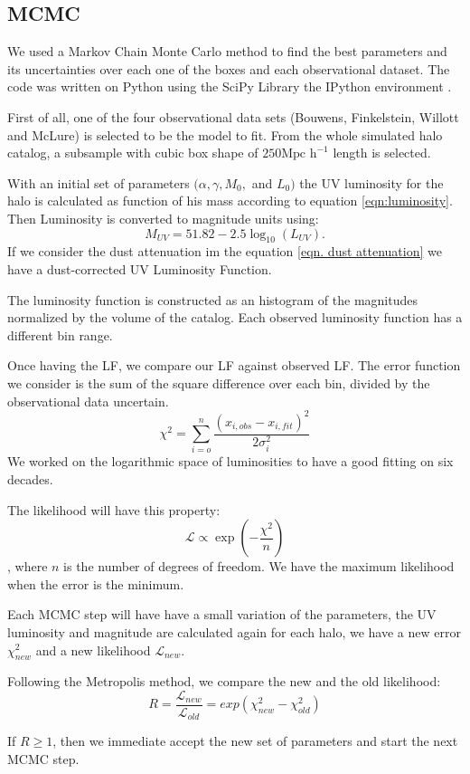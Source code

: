 \documentclass{emulateapj}
\begin{document}
\subsection{MCMC}
We used a Markov Chain Monte Carlo method to find the best parameters and its 
uncertainties over each one of the boxes and each observational dataset. The 
code was written on Python using the SciPy Library \citep{SciPy}
the IPython environment \citep{IPython}.

First of all, one of the four observational data sets (Bouwens, Finkelstein, 
Willott and McLure) is selected to be the model to fit.
From the whole simulated halo catalog, a subsample with cubic box shape of 
 $250\textrm{Mpc h}^{-1}$ length is selected. 
 
With an initial set of parameters $(\alpha, \gamma, M_0,$ and $ L_0)$ the UV 
luminosity for the halo is calculated as function of his mass according to 
equation
 \ref{eqn:luminosity}. Then Luminosity is converted to magnitude units using:
  \[ M_{UV} = 51.82 - 2.5 \log_{10}(L_{UV}). \]
If we consider the dust attenuation im the equation \ref{eqn. dust attenuation} 
we have a dust-corrected UV Luminosity Function.

The luminosity function is constructed as an histogram of the magnitudes 
normalized by the volume of the catalog. Each observed luminosity function has a 
different bin range.

Once having the LF, we compare our LF against observed LF. The error function we 
consider is the sum of the square difference over each bin, divided by the 
observational data uncertain.
\[ \chi^2  = \sum_{i=o}^{n} \frac {\left( x_{i,obs} - x_{i,fit} \right)^2 }{2\sigma_i^2}\]
We worked on the logarithmic space of luminosities to have a good fitting on
six decades.

The likelihood will have this property:
\[ \mathcal{L} \propto \exp \left(  -\frac{\chi ^2}{n} \right) \], where $n$ is 
the number of degrees of freedom. We have the maximum likelihood when the error 
is the minimum.

Each MCMC step will have have a small variation of the parameters, the UV 
luminosity and magnitude are calculated again for each halo, we have a new error 
$\chi_{new}^2$ and a new likelihood $ \mathcal{L}_{new} $.

Following the Metropolis method, we compare the new and the old likelihood:
\[ R =\frac{ \mathcal{L}_{new}  }{ \mathcal{L}_{old} }  = 
exp( \chi_{new}^2 - \chi_{old}^2 )
\]

If $  R \geq 1$, then we immediate accept the new set of parameters and start 
the next MCMC step.
\end{document}
